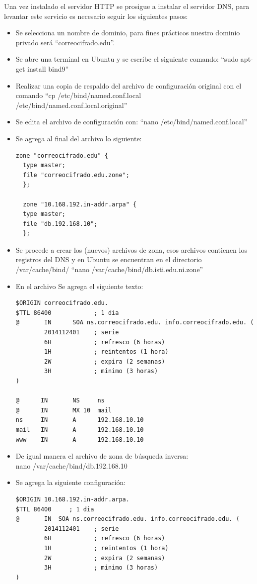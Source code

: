 \documentclass[12pt,oneside,onecolumn,openany]{report}
\begin{document}
Una vez instalado el servidor HTTP se prosigue a instalar el servidor DNS, para levantar este servicio es necesario seguir los siguientes pasos:
\begin{itemize}
 \item Se selecciona un nombre de dominio, para fines prácticos nuestro dominio privado será “correocifrado.edu”.
 \item Se abre una terminal en Ubuntu y se escribe el siguiente comando: “sudo apt-get install bind9”
 \item Realizar una copia de respaldo del archivo de configuración original con el comando “cp /etc/bind/named.conf.local \\ /etc/bind/named.conf.local.original”
 \item Se edita el archivo de configuración con: “nano /etc/bind/named.conf.local”
 \item Se agrega al final del archivo lo siguiente:
 \begin{lstlisting}[frame=single]
  zone "correocifrado.edu" {
  type master;
  file "correocifrado.edu.zone";
  };

  zone "10.168.192.in-addr.arpa" {
  type master;
  file "db.192.168.10";
  };
 \end{lstlisting}
 \item Se procede a crear los (nuevos) archivos de zona, esos archivos contienen los registros del DNS y en Ubuntu se encuentran en el directorio /var/cache/bind/ “nano /var/cache/bind/db.isti.edu.ni.zone”
 \item En el archivo Se agrega el siguiente texto:
 \begin{lstlisting}[frame=single]
  $ORIGIN correocifrado.edu.
$TTL 86400            ; 1 dia
@       IN      SOA ns.correocifrado.edu. info.correocifrado.edu. (
        2014112401    ; serie
        6H            ; refresco (6 horas)
        1H            ; reintentos (1 hora)
        2W            ; expira (2 semanas)
        3H            ; minimo (3 horas)
)

@      IN       NS     ns
@      IN       MX 10  mail
ns     IN       A      192.168.10.10
mail   IN       A      192.168.10.10
www    IN       A      192.168.10.10
 \end{lstlisting}
 \item De igual manera el archivo de zona de búsqueda inversa:\\
  nano /var/cache/bind/db.192.168.10
  \item Se agrega la siguiente configuración:    
  \begin{lstlisting}[frame=single]
   $ORIGIN 10.168.192.in-addr.arpa.
$TTL 86400     ; 1 dia
@       IN  SOA ns.correocifrado.edu. info.correocifrado.edu. (
        2014112401    ; serie
        6H            ; refresco (6 horas)
        1H            ; reintentos (1 hora)
        2W            ; expira (2 semanas)
        3H            ; minimo (3 horas)
)


\end{lstlisting}
\end{itemize}
\end{document}
